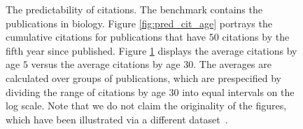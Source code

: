 \begin{figure}[ht!]
\begin{subfigure}[b]{0.48\textwidth}
     \label{fig:pred_cit_cit}
    \end{subfigure}
    \caption[Predictability of citations]{The predictability of citations. The benchmark contains the publications in biology. Figure \ref{fig:pred_cit_age} portrays the cumulative citations for publications that have $50$ citations by the fifth year since published. Figure \ref{fig:pred_cit_cit} displays the average citations by age $5$ versus the average citations by age $30$. The averages are calculated over groups of publications, which are prespecified by dividing the range of citations by age $30$ into equal intervals on the log scale. Note that we do not claim the originality of the figures, which have been illustrated via a different dataset~\cite{Wang2013}.}
    \label{fig:pub_cit_pred}
\end{figure}


